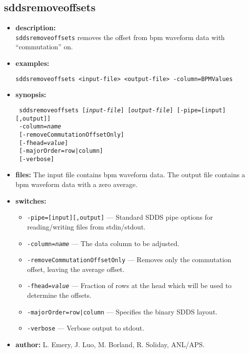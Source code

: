 \newpage 
\subsection{sddsremoveoffsets} 
\label{sddsremoveoffsets} 
 
\begin{itemize} 
\item {\bf description:} \hspace*{1mm}\\ 
{\tt sddsremoveoffsets} removes the offset from bpm waveform data with ``commutation'' on.
\item {\bf examples:} 
\begin{flushleft}
{\tt sddsremoveoffsets <input-file> <output-file> -column=BPMValues }
\end{flushleft} 
\item {\bf synopsis:}  
\begin{flushleft}
{\tt 
sddsremoveoffsets [{\em input-file}] [{\em output-file}] [-pipe=[input][,output]] \\ \
-column={\em name} \\ \
[-removeCommutationOffsetOnly] \\ \
[-fhead={\em value}] \\ \
[-majorOrder=row|column] \\ \
[-verbose]}
\end{flushleft} 
\item {\bf files:} 
The input file contains bpm waveform data. The output file contains a bpm waveform data with a zero average. 
\item {\bf switches:} 
    \begin{itemize} 
    \item {\tt -pipe=[input][,output]} --- Standard SDDS pipe options for reading/writing files from stdin/stdout.
    \item {\tt -column={\em name}} --- The data column to be adjusted.
    \item {\tt -removeCommutationOffsetOnly} --- Removes only the commutation offset, leaving the average offset.
    \item {\tt -fhead={\em value}} --- Fraction of rows at the head which will be used to determine the offsets.
    \item {\tt -majorOrder=row|column} --- Specifies the binary SDDS layout.
    \item {\tt -verbose} --- Verbose output to stdout.
\end{itemize} 

\item {\bf author:} L. Emery, J. Luo, M. Borland, R. Soliday, ANL/APS. 
\end{itemize} 
 
